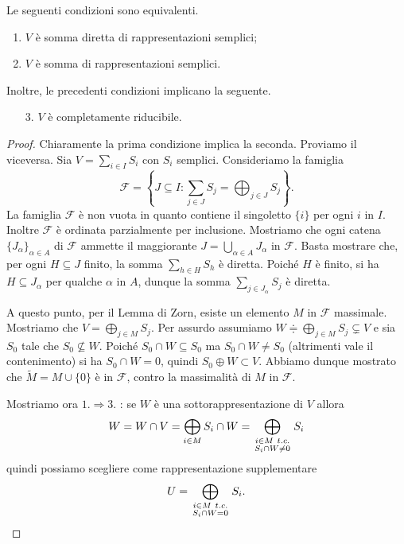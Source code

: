 \begin{proposition}\label{PrSommaSempliciESommaDirettaSemplici} Le seguenti condizioni sono equivalenti.
    \begin{enumerate}
        \item  $V$ è somma diretta di rappresentazioni semplici;
        \item $V$ è somma di rappresentazioni semplici.
    \end{enumerate}
    Inoltre, le precedenti condizioni implicano la seguente.
    \begin{enumerate}
        \item[3.] $V$ è completamente riducibile.
    \end{enumerate}
\end{proposition}
\begin{proof}
Chiaramente la prima condizione implica la seconda. Proviamo il viceversa. 
Sia $V=\sum_{i\in I} S_i$ con $S_i$ semplici. Consideriamo la famiglia 
\[\mathcal{F}=\left\{J\subseteq I    \colon  \sum_{j\in J} S_j = \bigoplus_{j\in J}S_j\right\}.\]
La famiglia $\mathcal{F}$ è non vuota in quanto contiene il singoletto $\{i\}$ per ogni $i$ in $I$. Inoltre $\mathcal{F}$ è ordinata parzialmente per inclusione. Mostriamo che ogni catena $\{J_\alpha\}_{\alpha \in A}$ di $\mathcal{F}$ ammette il maggiorante $J=\bigcup_{\alpha \in A}J_\alpha$ in $\mathcal{F}$. Basta mostrare che, per ogni $H\subseteq J$ finito, la somma $\sum_{h\in H} S_{h}$ è diretta.
Poiché $H$ è finito, si ha $H\subseteq J_\alpha$ per qualche $\alpha$ in $A$, dunque la somma $\sum_{j\in J_\alpha}S_j$ è diretta. 

A questo punto, per il Lemma di Zorn, esiste un elemento $M$ in $\mathcal{F}$ massimale. Mostriamo che $V=\bigoplus_{j\in M} S_j$. Per assurdo assumiamo $W\doteqdot\bigoplus_{j\in M} S_j\subsetneq V$ e sia $S_0$ tale che $S_0\not\subseteq W$. Poich\'e $S_0\cap W \subseteq S_0$ ma $S_0\cap W \neq S_0$ (altrimenti vale il contenimento) si ha $S_0\cap W=0$, quindi $S_0\oplus W \subset V$. Abbiamo dunque mostrato che $\widetilde{M}=M\cup\{0\}$ è in $\mathcal{F}$, contro la massimalità di $M$ in $\mathcal{F}$. 
\medskip

Mostriamo ora $1. \Rightarrow 3$. : se $W$ \`e una sottorappresentazione di $V$ allora
\[W=W\cap V=\bigoplus_{i\in M}S_i\cap W=\bigoplus_{\begin{smallmatrix}i\in M\ t.c.\\ S_i\cap W\neq 0\end{smallmatrix}}S_i\]
quindi possiamo scegliere come rappresentazione supplementare
\[U=\bigoplus_{\begin{smallmatrix}i\in M\ t.c.\\ S_i\cap W= 0\end{smallmatrix}}S_i.\]
\end{proof}

